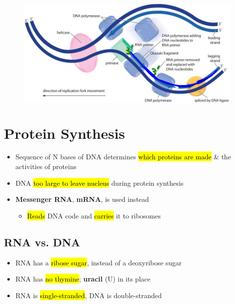 \documentclass[a4paper,12pt]{article}
\begin{document}
\begin{figure}[H]
    \centering
    \includegraphics[width=\textwidth]{split}
\end{figure}

\pagebreak

\section{Protein Synthesis}
\begin{itemize}
    \item{Sequence of N bases of DNA determines \hl{which proteins are made} \& the activities of proteins}
    \item{DNA \hl{too large to leave nucleus} during protein synthesis}
    \item{
            \textbf{Messenger RNA}, \textbf{mRNA}, is used instead
            \begin{itemize}
                \item{\hl{Reads} DNA code and \hl{carries} it to ribosomes}
            \end{itemize}
        }
\end{itemize}

\subsection{RNA vs. DNA}
\begin{itemize}
    \item{RNA has a \hl{ribose sugar}, instead of a deoxyribose sugar}
    \item{RNA has \hl{no thymine}; \textbf{uracil} (U) in its place}
    \item{RNA is \hl{single-stranded}, DNA is double-stranded}
\end{itemize}
\end{document}
